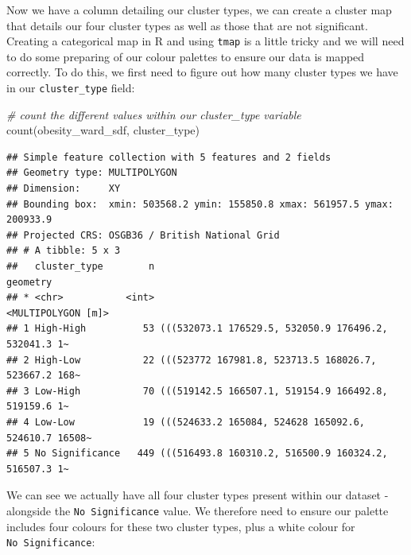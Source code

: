 \documentclass[
]{book}
\newenvironment{Shaded}{\begin{snugshade}}{\end{snugshade}}
\newcommand{\CommentTok}[1]{\textcolor[rgb]{0.56,0.35,0.01}{\textit{#1}}}
\newcommand{\FunctionTok}[1]{\textcolor[rgb]{0.00,0.00,0.00}{#1}}
\newcommand{\NormalTok}[1]{#1}
\begin{document}
Now we have a column detailing our cluster types, we can create a cluster map that details our four cluster types as well as those that are not significant. Creating a categorical map in R and using \texttt{tmap} is a little tricky and we will need to do some preparing of our colour palettes to ensure our data is mapped correctly. To do this, we first need to figure out how many cluster types we have in our \texttt{cluster\_type} field:

\begin{Shaded}
\begin{Highlighting}[]
\CommentTok{\# count the different values within our \textasciigrave{}cluster\_type\textasciigrave{} variable}
\FunctionTok{count}\NormalTok{(obesity\_ward\_sdf, cluster\_type)}
\end{Highlighting}
\end{Shaded}

\begin{verbatim}
## Simple feature collection with 5 features and 2 fields
## Geometry type: MULTIPOLYGON
## Dimension:     XY
## Bounding box:  xmin: 503568.2 ymin: 155850.8 xmax: 561957.5 ymax: 200933.9
## Projected CRS: OSGB36 / British National Grid
## # A tibble: 5 x 3
##   cluster_type        n                                             geometry
## * <chr>           <int>                                   <MULTIPOLYGON [m]>
## 1 High-High          53 (((532073.1 176529.5, 532050.9 176496.2, 532041.3 1~
## 2 High-Low           22 (((523772 167981.8, 523713.5 168026.7, 523667.2 168~
## 3 Low-High           70 (((519142.5 166507.1, 519154.9 166492.8, 519159.6 1~
## 4 Low-Low            19 (((524633.2 165084, 524628 165092.6, 524610.7 16508~
## 5 No Significance   449 (((516493.8 160310.2, 516500.9 160324.2, 516507.3 1~
\end{verbatim}

We can see we actually have all four cluster types present within our dataset - alongside the \texttt{No\ Significance} value. We therefore need to ensure our palette includes four colours for these two cluster types, plus a white colour for \texttt{No\ Significance}:
\end{document}
